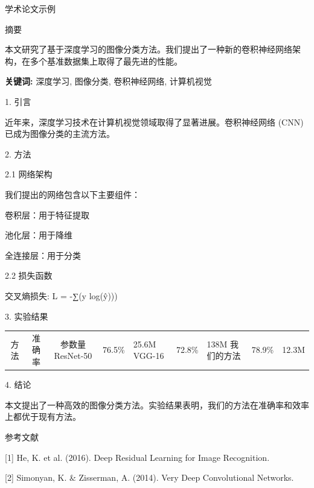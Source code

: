 \documentclass{article}
\begin{document}
学术论文示例

摘要

本文研究了基于深度学习的图像分类方法。我们提出了一种新的卷积神经网络架构，在多个基准数据集上取得了最先进的性能。

\textbf{关键词: }深度学习, 图像分类, 卷积神经网络, 计算机视觉

1. 引言

近年来，深度学习技术在计算机视觉领域取得了显著进展。卷积神经网络 (CNN) 已成为图像分类的主流方法。

2. 方法

2.1 网络架构

我们提出的网络包含以下主要组件：

卷积层：用于特征提取

池化层：用于降维

全连接层：用于分类

2.2 损失函数

交叉熵损失: L = -∑(y log(ŷ)))

3. 实验结果

\begin{tabular}{|c|c|c|}
\hline
方法 & 准确率 & 参数量
\hline
ResNet-50 & 76.5\% & 25.6M
\hline
VGG-16 & 72.8\% & 138M
\hline
我们的方法 & 78.9\% & 12.3M
\hline
\end{tabular}

4. 结论

本文提出了一种高效的图像分类方法。实验结果表明，我们的方法在准确率和效率上都优于现有方法。

参考文献

[1] He, K. et al. (2016). Deep Residual Learning for Image Recognition.

[2] Simonyan, K. & Zisserman, A. (2014). Very Deep Convolutional Networks.
\end{document}
